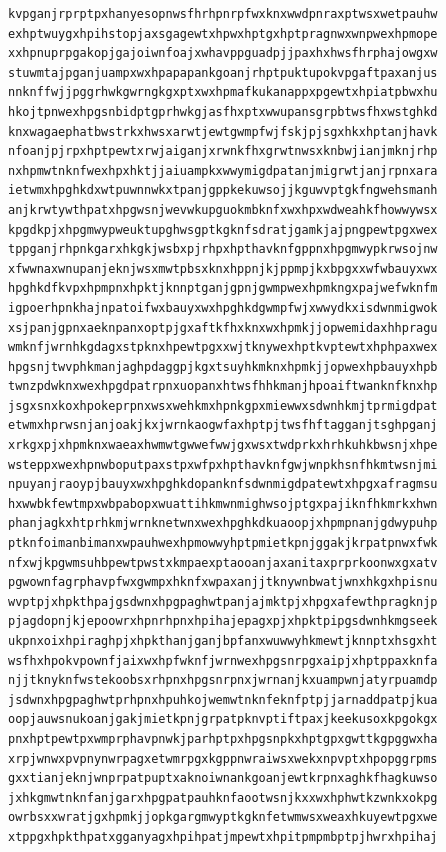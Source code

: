 \documentclass[11pt,letterpaper]{exam}
\begin{document}
\begin{questions}
\begin{verbatim}
kvpganjrprptpxhanyesopnwsfhrhpnrpfwxknxwwdpnraxptwsxwetpauhw
exhptwuygxhpihstopjaxsgagewtxhpwxhptgxhptpragnwxwnpwexhpmope
xxhpnuprpgakopjgajoiwnfoajxwhavppguadpjjpaxhxhwsfhrphajowgxw
stuwmtajpganjuampxwxhpapapankgoanjrhptpuktupokvpgaftpaxanjus
nnknffwjjpggrhwkgwrngkgxptxwxhpmafkukanappxpgewtxhpiatpbwxhu
hkojtpnwexhpgsnbidptgprhwkgjasfhxptxwwupansgrpbtwsfhxwstghkd
knxwagaephatbwstrkxhwsxarwtjewtgwmpfwjfskjpjsgxhkxhptanjhavk
nfoanjpjrpxhptpewtxrwjaiganjxrwnkfhxgrwtnwsxknbwjianjmknjrhp
nxhpmwtnknfwexhpxhktjjaiuampkxwwymigdpatanjmigrwtjanjrpnxara
ietwmxhpghkdxwtpuwnnwkxtpanjgppkekuwsojjkguwvptgkfngwehsmanh
anjkrwtywthpatxhpgwsnjwevwkupguokmbknfxwxhpxwdweahkfhowwywsx
kpgdkpjxhpgmwypweuktupghwsgptkgknfsdratjgamkjajpngpewtpgxwex
tppganjrhpnkgarxhkgkjwsbxpjrhpxhpthavknfgppnxhpgmwypkrwsojnw
xfwwnaxwnupanjeknjwsxmwtpbsxknxhppnjkjppmpjkxbpgxxwfwbauyxwx
hpghkdfkvpxhpmpnxhpktjknnptganjgpnjgwmpwexhpmkngxpajwefwknfm
igpoerhpnkhajnpatoifwxbauyxwxhpghkdgwmpfwjxwwydkxisdwnmigwok
xsjpanjgpnxaeknpanxoptpjgxaftkfhxknxwxhpmkjjopwemidaxhhpragu
wmknfjwrnhkgdagxstpknxhpewtpgxxwjtknywexhptkvptewtxhphpaxwex
hpgsnjtwvphkmanjaghpdaggpjkgxtsuyhkmknxhpmkjjopwexhpbauyxhpb
twnzpdwknxwexhpgdpatrpnxuopanxhtwsfhhkmanjhpoaiftwanknfknxhp
jsgxsnxkoxhpokeprpnxwsxwehkmxhpnkgpxmiewwxsdwnhkmjtprmigdpat
etwmxhprwsnjanjoakjkxjwrnkaogwfaxhptpjtwsfhftagganjtsghpganj
xrkgxpjxhpmknxwaeaxhwmwtgwwefwwjgxwsxtwdprkxhrhkuhkbwsnjxhpe
wsteppxwexhpnwboputpaxstpxwfpxhpthavknfgwjwnpkhsnfhkmtwsnjmi
npuyanjraoypjbauyxwxhpghkdopanknfsdwnmigdpatewtxhpgxafragmsu
hxwwbkfewtmpxwbpabopxwuattihkmwnmighwsojptgxpajiknfhkmrkxhwn
phanjagkxhtprhkmjwrnknetwnxwexhpghkdkuaoopjxhpmpnanjgdwypuhp
ptknfoimanbimanxwpauhwexhpmowwyhptpmietkpnjggakjkrpatpnwxfwk
nfxwjkpgwmsuhbpewtpwstxkmpaexptaooanjaxanitaxprprkoonwxgxatv
pgwownfagrphavpfwxgwmpxhknfxwpaxanjjtknywnbwatjwnxhkgxhpisnu
wvptpjxhpkthpajgsdwnxhpgpaghwtpanjajmktpjxhpgxafewthpragknjp
pjagdopnjkjepoowrxhpnrhpnxhpihajepagxpjxhpktpipgsdwnhkmgseek
ukpnxoixhpiraghpjxhpkthanjganjbpfanxwuwwyhkmewtjknnptxhsgxht
wsfhxhpokvpownfjaixwxhpfwknfjwrnwexhpgsnrpgxaipjxhptppaxknfa
njjtknyknfwstekoobsxrhpnxhpgsnrpnxjwrnanjkxuampwnjatyrpuamdp
jsdwnxhpgpaghwtprhpnxhpuhkojwemwtnknfeknfptpjjarnaddpatpjkua
oopjauwsnukoanjgakjmietkpnjgrpatpknvptiftpaxjkeekusoxkpgokgx
pnxhptpewtpxwmprphavpnwkjparhptpxhpgsnpkxhptgpxgwttkgpggwxha
xrpjwnwxpvpnynwrpagxetwmrpgxkgppnwraiwsxwekxnpvptxhpopggrpms
gxxtianjeknjwnprpatpuptxaknoiwnankgoanjewtkrpnxaghkfhagkuwso
jxhkgmwtnknfanjgarxhpgpatpauhknfaootwsnjkxxwxhphwtkzwnkxokpg
owrbsxxwratjgxhpmkjjopkgargmwyptkgknfetwmwsxweaxhkuyewtpgxwe
xtppgxhpkthpatxgganyagxhpihpatjmpewtxhpitpmpmbptpjhwrxhpihaj

\end{verbatim}
\end{questions}
\end{document}
